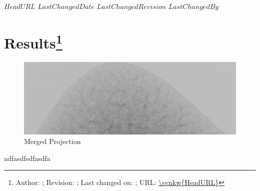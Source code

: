 \svnidlong
{$HeadURL$}
{$LastChangedDate$}
{$LastChangedRevision$}
{$LastChangedBy$}

\section{Results\footnote{Author: \svnauthor; Revision: \svnrev; Last changed on: \svndate; URL: \url{\svnkw{HeadURL}}}}
\begin{figure}[htbp]
	\centering
		\includegraphics[width=1.00\textwidth]{img/R108C36c_merge0801.png}
	\caption{Merged Projection}
	\label{fig:R108C36c_merge0801}
\end{figure}
adfasdfsdfasdfa
